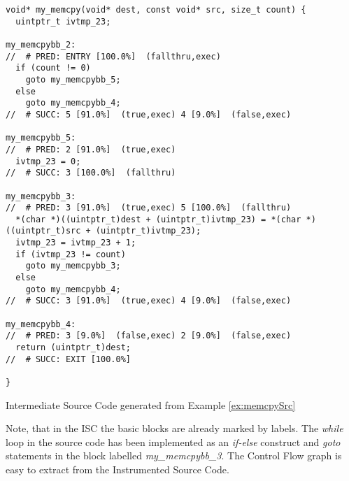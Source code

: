 \begin{Example}[h]
\begin{lstlisting}
void* my_memcpy(void* dest, const void* src, size_t count) {
  uintptr_t ivtmp_23;

my_memcpybb_2:
//  # PRED: ENTRY [100.0%]  (fallthru,exec)
  if (count != 0)
    goto my_memcpybb_5;
  else
    goto my_memcpybb_4;
//  # SUCC: 5 [91.0%]  (true,exec) 4 [9.0%]  (false,exec)

my_memcpybb_5:
//  # PRED: 2 [91.0%]  (true,exec)
  ivtmp_23 = 0;
//  # SUCC: 3 [100.0%]  (fallthru)

my_memcpybb_3:
//  # PRED: 3 [91.0%]  (true,exec) 5 [100.0%]  (fallthru)
  *(char *)((uintptr_t)dest + (uintptr_t)ivtmp_23) = *(char *)((uintptr_t)src + (uintptr_t)ivtmp_23);
  ivtmp_23 = ivtmp_23 + 1;
  if (ivtmp_23 != count)
    goto my_memcpybb_3;
  else
    goto my_memcpybb_4;
//  # SUCC: 3 [91.0%]  (true,exec) 4 [9.0%]  (false,exec)

my_memcpybb_4:
//  # PRED: 3 [9.0%]  (false,exec) 2 [9.0%]  (false,exec)
  return (uintptr_t)dest;
//  # SUCC: EXIT [100.0%] 

}
\end{lstlisting}
\caption{Intermediate Source Code generated from Example \ref{ex:memcpySrc}}
\label{ex:memcpyObj}
\end{Example}

Note, that in the ISC the basic blocks are already marked by labels. The \emph{while} loop in the source code has been implemented as an \emph{if-else} construct and \emph{goto} statements in the block labelled \emph{my\_memcpybb\_3}. The Control Flow graph is easy to extract from the Instrumented Source Code.
